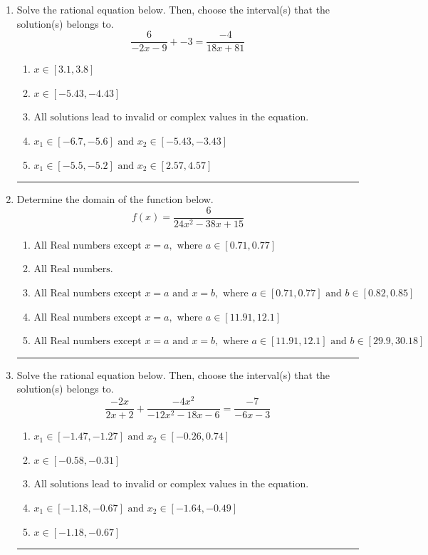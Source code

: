 \documentclass[14pt]{extbook}
\newcommand{\litem}[1]{\item#1\hspace*{-1cm}\rule{\textwidth}{0.4pt}}
\begin{document}
\begin{enumerate}
{\begin{enumerate}[label=\Alph*.]
\end{enumerate} }
\litem{
Solve the rational equation below. Then, choose the interval(s) that the solution(s) belongs to.\[ \frac{6}{-2x -9} + -3 = \frac{-4}{18x + 81} \]\begin{enumerate}[label=\Alph*.]
\item \( x \in [3.1,3.8] \)
\item \( x \in [-5.43,-4.43] \)
\item \( \text{All solutions lead to invalid or complex values in the equation.} \)
\item \( x_1 \in [-6.7, -5.6] \text{ and } x_2 \in [-5.43,-3.43] \)
\item \( x_1 \in [-5.5, -5.2] \text{ and } x_2 \in [2.57,4.57] \)

\end{enumerate} }
\litem{
Determine the domain of the function below.\[ f(x) = \frac{6}{24x^{2} -38 x + 15} \]\begin{enumerate}[label=\Alph*.]
\item \( \text{All Real numbers except } x = a, \text{ where } a \in [0.71, 0.77] \)
\item \( \text{All Real numbers.} \)
\item \( \text{All Real numbers except } x = a \text{ and } x = b, \text{ where } a \in [0.71, 0.77] \text{ and } b \in [0.82, 0.85] \)
\item \( \text{All Real numbers except } x = a, \text{ where } a \in [11.91, 12.1] \)
\item \( \text{All Real numbers except } x = a \text{ and } x = b, \text{ where } a \in [11.91, 12.1] \text{ and } b \in [29.9, 30.18] \)

\end{enumerate} }
\litem{
Solve the rational equation below. Then, choose the interval(s) that the solution(s) belongs to.\[ \frac{-2x}{2x + 2} + \frac{-4x^{2}}{-12x^{2} -18 x -6} = \frac{-7}{-6x -3} \]\begin{enumerate}[label=\Alph*.]
\item \( x_1 \in [-1.47, -1.27] \text{ and } x_2 \in [-0.26,0.74] \)
\item \( x \in [-0.58,-0.31] \)
\item \( \text{All solutions lead to invalid or complex values in the equation.} \)
\item \( x_1 \in [-1.18, -0.67] \text{ and } x_2 \in [-1.64,-0.49] \)
\item \( x \in [-1.18,-0.67] \)


\end{enumerate}}
\end{enumerate}
\end{document}
